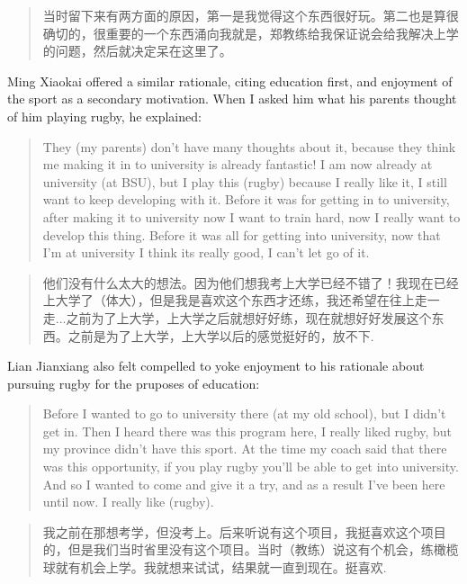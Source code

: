 \begin{CJK}{UTF8}{gbsn}
    \begin{quotation}
      当时留下来有两方面的原因，第一是我觉得这个东西很好玩。第二也是算很确切的，很重要的一个东西涌向我就是，郑教练给我保证说会给我解决上学的问题，然后就决定呆在这里了。 
    \end{quotation}

Ming Xiaokai offered a similar rationale, citing education first, and enjoyment of the sport as a secondary motivation.  When I asked him what his parents thought of him playing rugby, he explained:

    \begin{quotation}
      They (my parents) don't have many thoughts about it, because they think me making it in to university is already fantastic! I am now already at university (at BSU), but I play this (rugby) because I really like it, I still want to keep developing with it. Before it was for getting in to university, after making it to university now I want to train hard, now I really want to develop this thing.  Before it was all for getting into university, now that I'm at university I think its really good, I can't let go of it.
    \end{quotation}

    \begin{quotation}
      他们没有什么太大的想法。因为他们想我考上大学已经不错了！我现在已经上大学了（体大），但是我是喜欢这个东西才还练，我还希望在往上走一走...之前为了上大学，上大学之后就想好好练，现在就想好好发展这个东西。之前是为了上大学，上大学以后的感觉挺好的，放不下.
    \end{quotation}

Lian Jianxiang also felt compelled to yoke enjoyment to his rationale about pursuing rugby for the pruposes of education:

    \begin{quotation}
        Before I wanted to go to university there (at my old school), but I didn't get in.  Then I heard there was this program here, I really liked rugby, but my province didn't have this sport. At the time my coach said that there was this opportunity, if you play rugby you'll be able to get into university.  And so I wanted to come and give it a try, and as a result I've been here until now.  I really like (rugby).
    \end{quotation}

    \begin{quotation}
        我之前在那想考学，但没考上。后来听说有这个项目，我挺喜欢这个项目的，但是我们当时省里没有这个项目。当时（教练）说这有个机会，练橄榄球就有机会上学。我就想来试试，结果就一直到现在。挺喜欢.
    \end{quotation}


\end{CJK}
